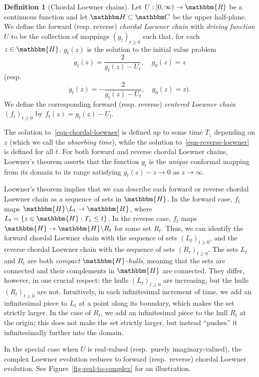 \documentclass[11pt]{article}
\theoremstyle{plain}
\theoremstyle{definition}
\newtheorem{defn}[thm]{Definition}
\numberwithin{equation}{section}
\newcommand{\eqb}{\begin{equation}}
\newcommand{\eqe}{\end{equation}}
\newcommand{\BB}{\mathbbm}
\newcommand{\rta}{\rightarrow}
\begin{document}
\begin{defn}[Chordal Loewner chains]
\label{defn-chordal-loewner}
Let $U : [0,\infty) \rta \BB{R}$ be a continuous function and let $\BB H \subset\BB C$ be the upper half-plane.  We define the forward (resp. reverse) \emph{chordal Loewner chain} with \emph{driving function} $U $ to be the collection of mappings $(g_t)_{t \geq 0}$ such that, for each $z \in \BB{H}$, $g_t(z)$ is the solution to the initial value problem  
\eqb
\label{eqn-chordal-loewner}
\dot g_t(z) =  \frac{2}{g_t(z) - U_t}   ,\quad g_0(z) =z  
\eqe
(resp.\
\eqb
\label{eqn-reverse-loewner}
\dot g_t(z) =  -\frac{2}{g_t(z) - U_t}   ,\quad g_0(z) =z  ). 
\eqe 
 We define the corresponding forward (resp. reverse) \emph{centered Loewner chain} $(f_t)_{t \geq 0}$ by $f_t(z) = g_t(z) - U_t$.
\end{defn}

The solution to~\eqref{eqn-chordal-loewner} is defined up to some time $T_z$ depending on $z$ (which we call the \emph{absorbing time}), while the solution to~\eqref{eqn-reverse-loewner} is defined for all $t$.  
For both forward and reverse chordal Loewner chains, Loewner's theorem asserts that the function $g_t$ is the \emph{unique} conformal mapping from its domain to its range satisfying $g_t(z) - z \rta 0$ as $z \rta \infty$. 

Loewner's theorem implies that we can describe each forward or reverse chordal Loewner chain as a sequence of sets in $\BB{H}$. 
In the forward case, $f_t$ maps $\BB{H} \backslash L_t \rta \BB{H}$, where  $L_t = \{z \in \BB{H} : T_z \leq t\}$.  In the reverse case,  $f_t$ maps $\BB{H}  \rta \BB{H} \backslash R_t$ for some set $R_t$.  Thus, we can identify the forward chordal Loewner chain with the sequence of sets $(L_t)_{t \geq 0}$, and the reverse chordal Loewner chain with the sequence of sets $(R_t)_{t \geq 0}$.  The sets $L_t$ and $R_t$ are both \emph{compact $\BB{H}$-hulls}, meaning that the sets are connected and their complements in $\BB{H}$ are connected.  They differ, however, in one crucial respect: the hulls $(L_t)_{t \geq 0}$ are increasing, but the hulls $(R_t)_{t \geq 0}$ are not. Intuitively, in each  infinitesimal increment of time, we add an infinitesimal piece to $L_t$ at a point along its boundary, which makes the set strictly larger.  In the case of $R_t$,  we add an infinitesimal piece to the hull $R_t$ at the origin; this does not make the set strictly larger, but instead ``pushes'' it infinitesimally further into the domain. 

In the special case when $U$ is real-valued (resp.\ purely imaginary-valued), the complex Loewner evolution reduces to forward (resp.\ reverse) chordal Loewner evolution. 
See Figure~\ref{fig-real-to-complex} for an illustration. 
\end{document}
